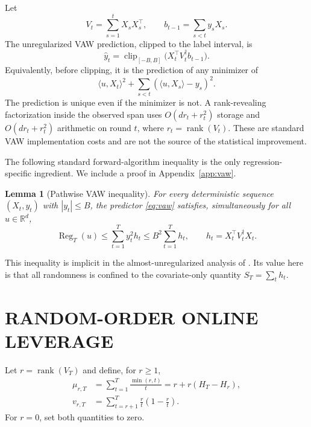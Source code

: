 \documentclass[twoside]{article}
\newtheorem{lemma}[theorem]{Lemma}
\newcommand{\R}{\mathbb R}
\newcommand{\clip}{\operatorname{clip}}
\newcommand{\rank}{\operatorname{rank}}
\newcommand{\Reg}{\operatorname{Reg}}
\begin{document}
Let
\[
 V_t=\sum_{s=1}^tX_sX_s^\top,
 \qquad b_{t-1}=\sum_{s<t}y_sX_s.
\]
The unregularized VAW prediction, clipped to the label interval, is
\begin{equation}
 \widehat y_t=\clip_{[-B,B]}\bigl(X_t^\top V_t^\dagger b_{t-1}\bigr).
 \label{eq:vaw}
\end{equation}
Equivalently, before clipping, it is the prediction of any minimizer of
\[
 \langle u,X_t\rangle^2+
 \sum_{s<t}(\langle u,X_s\rangle-y_s)^2.
\]
The prediction is unique even if the minimizer is not. A rank-revealing factorization inside the observed span uses $O(dr_t+r_t^2)$ storage and $O(dr_t+r_t^2)$ arithmetic on round $t$, where $r_t=\rank(V_t)$. These are standard VAW implementation costs and are not the source of the statistical improvement.

The following standard forward-algorithm inequality is the only regression-specific ingredient. We include a proof in Appendix~\ref{app:vaw}.

\begin{lemma}[Pathwise VAW inequality]
\label{lem:vaw}
For every deterministic sequence $(X_t,y_t)$ with $|y_t|\le B$, the predictor \eqref{eq:vaw} satisfies, simultaneously for all $u\in\R^d$,
\begin{equation}
 \Reg_T(u)\le \sum_{t=1}^T y_t^2h_t
 \le B^2\sum_{t=1}^Th_t,
 \qquad h_t=X_t^\top V_t^\dagger X_t.
 \label{eq:vaw-bound}
\end{equation}
\end{lemma}

This inequality is implicit in the almost-unregularized analysis of \citet[Theorem 11]{gaillard2019uniform}. Its value here is that all randomness is confined to the covariate-only quantity $S_T=\sum_t h_t$.

\section{RANDOM-ORDER ONLINE LEVERAGE}
\label{sec:leverage}

Let $r=\rank(V_T)$ and define, for $r\ge1$,
\begin{align}
 \mu_{r,T}&=\sum_{t=1}^T\frac{\min(r,t)}t
 =r+r(H_T-H_r),
 \label{eq:mu}\\
 v_{r,T}&=\sum_{t=r+1}^T\frac rt\left(1-\frac rt\right).
 \label{eq:variance}
\end{align}
For $r=0$, set both quantities to zero.
\end{document}
